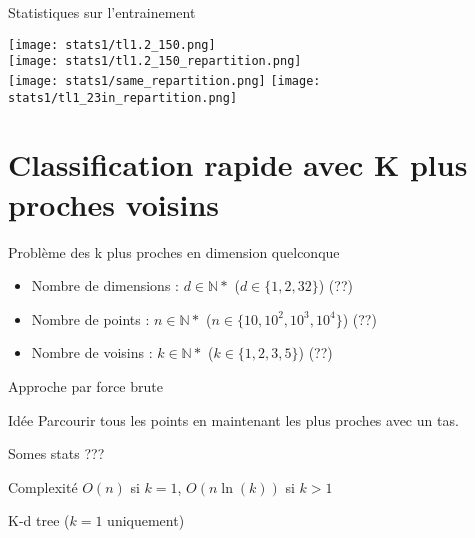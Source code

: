 \documentclass{falconbeamer}
\begin{document}
\begin{frame}{Statistiques sur l'entrainement}
	\begin{center}
		\texttt{[image: stats1/tl1.2\_150.png]} \\
		\texttt{[image: stats1/tl1.2\_150\_repartition.png]} \\
		\texttt{[image: stats1/same\_repartition.png]}
		\texttt{[image: stats1/tl1\_23in\_repartition.png]}
	\end{center}
\end{frame}

\section{Classification rapide avec K plus proches voisins}

\begin{frame}{Problème des k plus proches en dimension quelconque}
		\begin{center}
		\end{center}
		
		\begin{itemize}
			\item Nombre de dimensions : $d\in\mathbb{N}*$ ($d\in\{1,2,32\}$) (??)
			\item Nombre de points : $n\in\mathbb{N}*$ ($n\in\{10,10^2,10^3,10^4\}$) (??)
			\item Nombre de voisins : $k\in\mathbb{N}*$  ($k\in\{1,2,3,5\}$) (??)
		\end{itemize}
	\end{frame}

\begin{frame}{Approche par force brute}
	\begin{block}{Idée}
		Parcourir tous les points en maintenant les plus proches avec un tas.
	\end{block}

	Somes stats ???
	
	\begin{block}{Complexité}
			$O(n)$ si $k=1$, $O(n\ln(k))$ si $k>1$
	\end{block}
\end{frame}

\begin{frame}{K-d tree ($k=1$ uniquement)}
	
	\begin{center}
	\end{center}
	
	
\end{frame}
\end{document}
